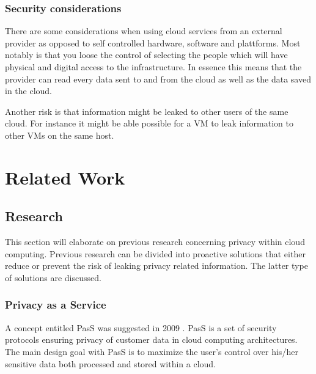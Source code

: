 \documentclass[pdftex,english,10pt,b5paper,twoside]{book}
\begin{document}
\subsection{Security considerations}
There are some considerations when using cloud services from an external provider
as opposed to self controlled hardware, software and plattforms. Most notably
is that you loose the control of selecting the people which will have physical
and digital access to the infrastructure. In essence this means that the
provider can read every data sent to and from the cloud as well as the data
saved in the cloud.

Another risk is that information might be leaked to other users of the same
cloud. For instance it might be able possible for a \ac{VM} to leak information
to other \ac{VM}s on the same host.

\chapter{Related Work}

\section{Research}
This section will elaborate on previous research concerning privacy within cloud
computing. Previous research can be divided into proactive solutions that
either reduce or prevent the risk of leaking privacy related information. The
latter type of solutions are discussed.

\subsection{Privacy as a Service}
A concept entitled \ac{PasS} was suggested in 2009
\cite{PasS}. PasS is a set of security protocols ensuring privacy of customer
data in cloud computing architectures. The main design goal with PasS is to
maximize the user's control over his/her sensitive data both processed and stored
within a cloud.
\end{document}
